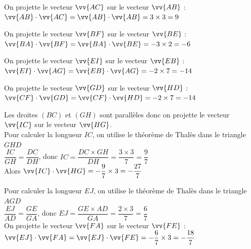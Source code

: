 \documentclass[11pt,a4paper]{article}  %
\begin{document}
\begin{corrBox}
\begin{enumMet}
	\item On projette le vecteur $\vv{A C}$ sur le vecteur $\vv{A B}$ :\\
	$\vv{A B} \cdot \vv{A C}=\vv{A B} \cdot \vv{A B}=3 \times 3=9$
	\item On projette le vecteur $\vv{B F}$ sur le vecteur $\vv{B E}$ :\\
	$\vv{B A} \cdot \vv{B F}=\vv{B A} \cdot \vv{B E}=-3 \times 2=-6$
	\item On projette le vecteur $\vv{E I}$ sur le vecteur $\vv{E B}$ :\\
	$\vv{E I} \cdot \vv{A G}=\vv{E B} \cdot \vv{A G}=-2 \times 7=-14$
	\item On projette le vecteur $\vv{G D}$ sur le vecteur $\vv{H D}$ :\\
	$\vv{C F} \cdot \vv{G D}=\vv{C F} \cdot \vv{H D}=-2 \times 7=-14$
	\item Les droites $(B C)$ et $(G H)$ sont parallèles donc on projette le vecteur $\vv{I C}$ sur le vecteur $\vv{H G}$.\\
	Pour calculer la longueur $I C$, on utilise le théorème de Thalès dans le triangle $G H D$\\
	$\dfrac{I C}{G H}=\dfrac{D C}{D H}$, donc $ I C=\dfrac{D C \times G H}{D H}=\dfrac{3 \times 3}{7}=\dfrac{9}{7}$\\
	Alors $\vv{I C} \cdot \vv{H G}=-\dfrac{9}{7} \times 3=-\dfrac{27}{7}$
	\item Pour calculer la longueur $E J$, on utilise le théorème de Thalès dans le triangle $A G D$\\
	$\dfrac{E J}{A D}=\dfrac{G E}{G A}$, donc $ E J=\dfrac{G E \times A D}{G A}=\dfrac{2 \times 3}{7}=\dfrac{6}{7}$\\
	On projette le vecteur $\vv{F A}$ sur le vecteur $\vv{F E}$ :\\
	$\vv{E J} \cdot \vv{F A}=\vv{E J} \cdot \vv{F E}=-\dfrac{6}{7} \times 3=-\dfrac{18}{7}$
\end{enumMet}	
\end{corrBox}
\end{document}
